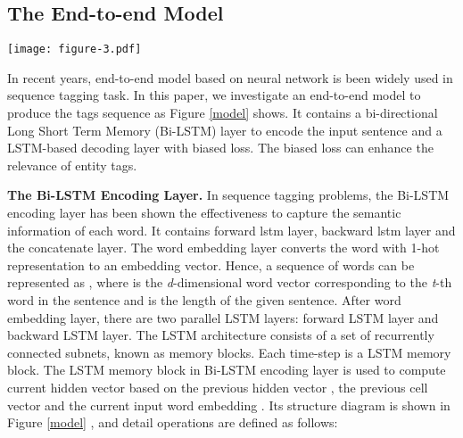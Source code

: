\documentclass[11pt,a4paper]{article}
\begin{document}
\subsection{The End-to-end Model}
\begin{figure*}[ht]
 \begin{center}
\texttt{[image: figure-3.pdf]}
\caption{\label{model}
An illustration of our model. (a): The architecture of the end-to-end model,
(b): The LSTM memory block in Bi-LSTM encoding layer, (c): The LSTM memory block in LSTM decoding layer.
}
 \end{center}
\end{figure*}
In recent years, end-to-end model based on neural network is been widely used in sequence tagging task.
In this paper, we investigate an end-to-end model to produce the tags sequence as Figure \ref{model} shows.
It contains a bi-directional Long Short Term Memory (Bi-LSTM) layer to encode the input sentence
and a LSTM-based decoding layer with biased loss.
The biased loss can enhance the relevance of entity tags.

\noindent\textbf{The Bi-LSTM Encoding Layer.}
In sequence tagging problems, the Bi-LSTM encoding layer has been shown the effectiveness to
capture the semantic information of each word.
It contains forward lstm layer, backward lstm layer
and the concatenate layer.
The word embedding layer converts the word with 1-hot representation to an embedding vector.
Hence, a sequence of words can be represented as ,
where  is the \emph{d}-dimensional word vector corresponding
to the \emph{t}-th word in the sentence and  is the length of the given sentence.
After word embedding layer, there are two parallel LSTM layers: forward LSTM layer and backward LSTM layer.
The LSTM architecture consists of a set of recurrently connected subnets, known
as memory blocks. Each time-step is a LSTM memory block.
The LSTM memory block in Bi-LSTM encoding layer is used to compute current hidden vector 
based on the previous hidden vector , the previous cell vector  and the current input word embedding .
Its structure diagram is shown in Figure \ref{model} , and detail operations are defined as follows:

\vspace{-0.8cm}

\vspace{-0.5cm}

\vspace{-0.5cm}

\vspace{-0.8cm}
\end{document}
